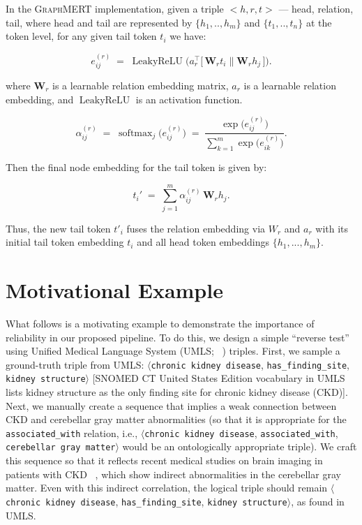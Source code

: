 \documentclass[10pt]{article}
\newcommand{\ours}{\textsc{GraphMERT}\xspace}
\begin{document}
In the \ours implementation, given a triple $<h, r, t>$ --- head, relation, tail, where head and tail are represented by $\{h_1, .., h_m\}$ and $\{t_1, .., t_n\}$ at the token level, for any given tail token $t_i$ we have:

\begin{equation}
e_{ij}^{(r)} \;=\; \operatorname{LeakyReLU}\!\Big(
  a_r^{\top}
  \big[\, \mathbf{W}_r t_i \mathbin{\|} \mathbf{W}_r h_j \,\big]
\Big).    
\end{equation}


\noindent
where $\mathbf{W}_r$ is a learnable relation embedding matrix, $a_{r}$ is a learnable relation embedding, and $\operatorname{LeakyReLU}$ is an activation function.

\begin{equation}
\alpha_{ij}^{(r)}
\;=\;
\operatorname{softmax}_{j}\!\big(e_{ij}^{(r)}\big)
\;=\;
\frac{\exp\!\big(e_{ij}^{(r)}\big)}{\sum_{k=1}^{m}\exp\!\big(e_{ik}^{(r)}\big)} .
\end{equation}

Then the final node embedding for the tail token is given by:

\begin{equation}
t_i'
\;=\;
\sum_{j=1}^{m} \alpha_{ij}^{(r)} \,\mathbf{W}_r h_j .
\end{equation}

Thus, the new tail token $t'_i$ fuses the relation embedding via $W_r$ and $a_r$ with its initial tail token embedding $t_i$ and all head token embeddings $\{h_1,..., h_m\}$.

\section{Motivational Example}
\label{sec:motivation}
What follows is a motivating example to demonstrate the importance of reliability in our proposed pipeline. To do this, we design a simple ``reverse test'' using Unified Medical Language System (UMLS; ~\citealt{UMLS}) triples. First, we sample a ground-truth triple from UMLS: $\langle$\texttt{chronic kidney disease}, \texttt{has\_finding\_site}, \texttt{kidney structure}$\rangle$ [SNOMED CT United States Edition vocabulary in UMLS lists kidney structure as the only finding site for chronic kidney disease (CKD)]. Next, we manually create a sequence that implies a weak connection between CKD and cerebellar gray matter abnormalities (so that it is appropriate for the \texttt{associated\_with} relation, i.e., $\langle$\texttt{chronic kidney disease}, \texttt{associated\_with}, \texttt{cerebellar gray matter}$\rangle$ would be an ontologically appropriate triple). We craft this sequence so that it reflects recent medical studies on brain imaging in patients with CKD ~\cite{xiao2024brain}, which show indirect abnormalities in the cerebellar gray matter. Even with this indirect correlation, the logical triple should remain $\langle$\texttt{chronic kidney disease}, \texttt{has\_finding\_site}, \texttt{kidney structure}$\rangle$, as found in UMLS.
\end{document}
